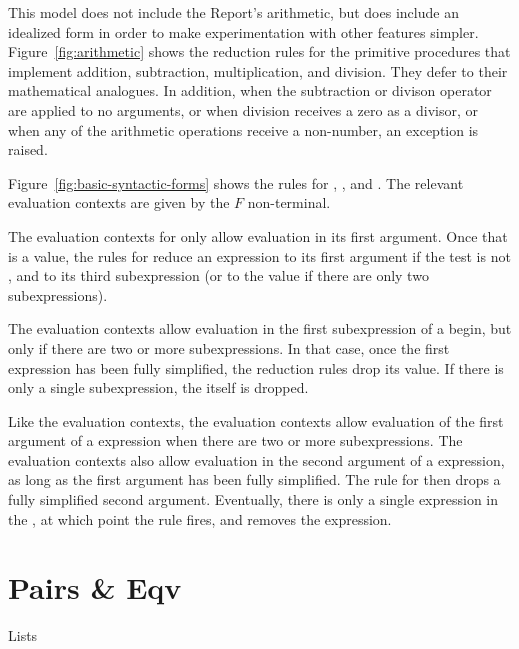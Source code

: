 This model does not include the Report's arithmetic, but does include
an idealized form in order to make experimentation with other features
simpler. Figure~\ref{fig:arithmetic} shows the reduction rules for the
primitive procedures that implement addition, subtraction,
multiplication, and division. They defer to their mathematical
analogues. In addition, when the subtraction or divison operator are
applied to no arguments, or when division receives a zero as a
divisor, or when any of the arithmetic operations receive a
non-number, an exception is raised.

Figure~\ref{fig:basic-syntactic-forms} shows the rules for
, , and . The relevant
evaluation contexts are given by the $F$ non-terminal.

The evaluation contexts for  only allow evaluation in its
first argument. Once that is a value, the rules for  reduce
an  expression to its first argument if the test is not
\semfalse{}, and to its third subexpression (or to the value
 if there are only two subexpressions).

The  evaluation contexts allow evaluation in the first
subexpression of a begin, but only if there are two or more
subexpressions. In that case, once the first expression has been fully
simplified, the reduction rules drop its value. If there is only a
single subexpression, the  itself is dropped.

Like the  evaluation contexts, the 
evaluation contexts allow evaluation of the first argument of a
 expression when there are two or more subexpressions.
The  evaluation contexts also allow evaluation in the
second argument of a  expression, as long as the first
argument has been fully simplified. The  rule for
 then drops a fully simplified second argument.
Eventually, there is only a single expression in the ,
at which point the  rule fires, and removes the
 expression.

\section{Pairs \& Eqv}

\beginfig
\begin{center}

\end{center}
\caption{Lists}\label{fig:cons-cells}
\endfig

